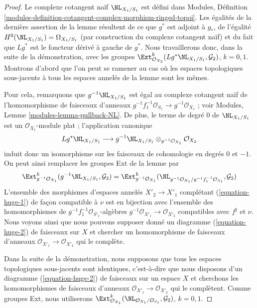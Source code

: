 \begin{proof}
Le complexe cotangent naïf $\NL_{X_1/S_1}$ est défini dans Modules,
Définition \ref{modules-definition-cotangent-complex-morphism-ringed-topoi}.
Les égalités de la dernière assertion de la lemme résultent de ce que
$g^*$ est adjoint à $g_*$, de l'égalité
$H^0(\NL_{X_1/S_1}) = \Omega_{X_1/S_1}$ (par construction du complexe
cotangent naïf) et du fait que $Lg^*$ est le foncteur dérivé à gauche de
$g^*$. Nous travaillerons donc, dans la suite de la démonstration, avec les
groupes
$\Ext^k_{\mathcal{O}_{X_2}}(Lg^*\NL_{X_1/S_1}, \mathcal{G}_2)$,
$k = 0, 1$. Montrons d'abord que l'on peut se ramener au cas où les espaces
topologiques sous-jacents à tous les espaces annelés de la lemme sont les mêmes.

\medskip\noindent
Pour cela, remarquons que $g^{-1}\NL_{X_1/S_1}$ est égal au complexe
cotangent naïf de l'homomorphisme de faisceaux d'anneaux
$g^{-1}f_1^{-1}\mathcal{O}_{S_1} \to g^{-1}\mathcal{O}_{X_1}$ ; voir
Modules, Lemme \ref{modules-lemma-pullback-NL}.
De plus, le terme de degré $0$ de $\NL_{X_1/S_1}$ est un
$\mathcal{O}_{X_1}$-module plat ; l'application canonique
$$
Lg^*\NL_{X_1/S_1}
\longrightarrow
g^{-1}\NL_{X_1/S_1} \otimes_{g^{-1}\mathcal{O}_{X_1}} \mathcal{O}_{X_2}
$$
induit donc un isomorphisme sur les faisceaux de cohomologie en degrés $0$ et
$-1$. On peut ainsi remplacer les groupes Ext de la lemme par
$$
\Ext^k_{g^{-1}\mathcal{O}_{X_1}}(g^{-1}\NL_{X_1/S_1}, \mathcal{G}_2) =
\Ext^k_{g^{-1}\mathcal{O}_{X_1}}(
\NL_{g^{-1}\mathcal{O}_{X_1}/g^{-1}f_1^{-1}\mathcal{O}_{S_1}}, \mathcal{G}_2)
$$
L'ensemble des morphismes d'espaces annelés $X'_2 \to X'_1$ complétant
(\ref{equation-huge-1}) de façon compatible à $\nu$ est en bijection avec
l'ensemble des homomorphismes de $g^{-1}f_1^{-1}\mathcal{O}_{S'_1}$-algèbres
$g^{-1}\mathcal{O}_{X'_1} \to \mathcal{O}_{X'_2}$ compatibles avec
$f^\sharp$ et $\nu$. Nous voyons ainsi que nous pouvons supposer donné un
diagramme (\ref{equation-huge-2}) de faisceaux sur $X$ et chercher un
homomorphisme de faisceaux d'anneaux
$\mathcal{O}_{X'_1} \to \mathcal{O}_{X'_2}$ qui le complète.

\medskip\noindent
Dans la suite de la démonstration, nous supposons que tous les espaces
topologiques sous-jacents sont identiques, c'est-à-dire que nous disposons
d'un diagramme (\ref{equation-huge-2}) de faisceaux sur un espace $X$ et
cherchons les homomorphismes de faisceaux d'anneaux
$\mathcal{O}_{X'_1} \to \mathcal{O}_{X'_2}$ qui le complètent.
Comme groupes Ext, nous utiliserons
$\Ext^k_{\mathcal{O}_{X_1}}(
\NL_{\mathcal{O}_{X_1}/\mathcal{O}_{S_1}}, \mathcal{G}_2)$, $k = 0, 1$.


\end{proof}
